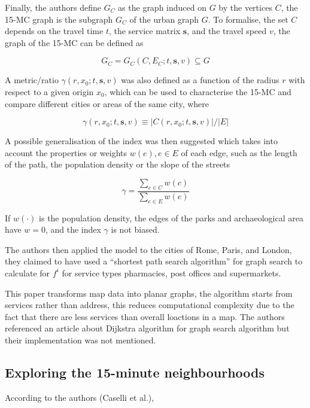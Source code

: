 Finally, the authors define $G_C$ as the graph induced on $G$ by the vertices $C$, the 15-MC graph is the subgraph $G_C$ of the urban graph $G$. To formalise, the set $C$ depends on the travel time $t$, the service matrix $\mathbf s$, and the travel speed $v$, the graph of the 15-MC can be defined as

$$ G_C=G_C(C,E_C;t,\mathbf s,v)\subseteq G $$

A metric/ratio $\gamma(r,x_0;t,\mathbf s,v)$ was also defined as a function of the radius $r$ with respect to a given origin $x_0$, which can be used to characterise the 15-MC and compare different cities or areas of the same city, where

$$ \gamma(r,x_0;t,\mathbf s,v)\equiv|C(r,x_0;t,\mathbf s,v)|/|E| $$

A possible generalisation of the index was then suggested which takes into account the properties or weights $w(e),e\in E$ of each edge, such as the length of the path, the population density or the slope of the streets

$$ \gamma=\frac{\sum_{c\in C}w(c)}{\sum_{e\in E}w(e)} $$

If $w(\cdot)$ is the population density, the edges of the parks and archaeological area have $w = 0$, and the index $\gamma$ is not biased.

The authors then applied the model to the cities of Rome, Paris, and London, they claimed to have used a ``shortest path search algorithm” for graph search \cite{dijkstra_note_1959} to calculate for $f^i$ for service types pharmacies, post offices and supermarkets.

This paper transforms map data into planar graphs, the algorithm starts from services rather than address, this reduces computational complexity due to the fact that there are less services than overall loactions in a map. The authors referenced an article about Dijkstra algorithm for graph search algorithm but their implementation was not mentioned.

\subsection{Exploring the 15-minute neighbourhoods} \label{caselli_exploring_2022}

According to the authors (Caselli et al.),  \cite{caselli_exploring_2022}

